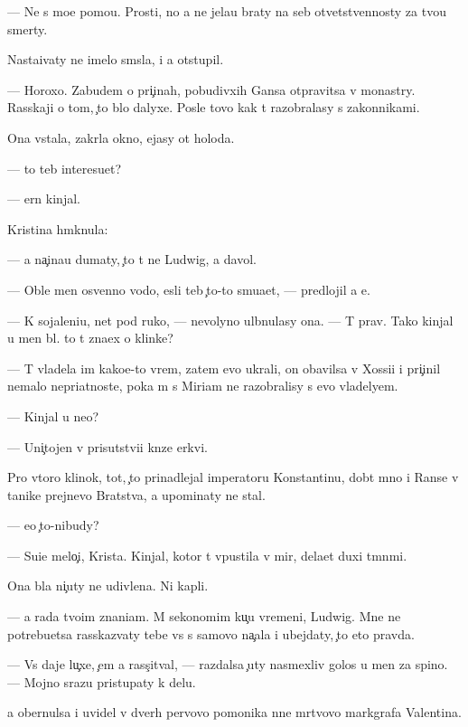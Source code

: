 \documentclass[10pt]{book}
\begin{document}
— Ne s mo{\y}e{\y} pomo{\x}{\y}u. Prosti, no {\y}a ne jela{\y}u braty na seb{\ia} otvetstvennosty za tvo{\y}u smerty.

Nasta{\y}ivaty ne imelo sm{\yi}sla, i {\y}a otstupil.

— Horoxo. Zabudem o pri{\c}inah, pobudivxih Gansa otpravitsa v monast{\yi}ry. Rasskaji o tom, {\c}to b{\yi}lo dalyxe. Posle tovo kak t{\yi} razobralasy s zakonnikami.

Ona vstala, zakr{\yi}la okno, {\y}ejasy ot holoda.

— {\C}to teb{\ia} interesu{\y}et?

— {\C}ern{\yi}{\y} kinjal.

Kristina hm{\yi}knula:

— {\Y}a na{\c}ina{\y}u dumaty, {\c}to t{\yi} ne Ludwig, a d{\y}avol.

— Oble{\y} men{\ia} osv{\ia}{\x}enno{\y} vodo{\y}, {\y}esli teb{\ia} {\c}to-to smu{\x}a{\y}et, — predlojil {\y}a {\y}e{\y}.

— K sojaleni{\y}u, net pod ruko{\y}, — nevolyno ul{\yi}bnulasy ona. — T{\yi} prav. Tako{\y} kinjal u men{\ia} b{\yi}l. {\C}to t{\yi} zna{\y}ex o klinke?

— T{\yi} vladela im kako{\y}e-to vrem{\ia}, zatem {\y}evo ukrali, on ob{\y}avilsa v Xossi{\y}i i pri{\c}inil nemalo nepri{\y}atnoste{\y}, poka m{\yi} s Miriam ne razobralisy s {\y}evo vladely{\q}em.

— Kinjal u ne{\y}o?

— Uni{\c}tojen v prisutstvi{\y}i kn{\ia}ze{\y} {\Q}erkvi.

Pro vtoro{\y} klinok, tot, {\c}to prinadlejal imperatoru Konstantinu, dob{\yi}t{\yi}{\y} mno{\y} i Ranse v ta{\y}nike prejnevo Bratstva, {\y}a upominaty ne stal.

— {\y}e{\x}o {\c}to-nibudy?

— Su{\x}i{\y}e melo{\c}i, Krista. Kinjal, kotor{\yi}{\y} t{\yi} v{\yi}pustila v mir, dela{\y}et duxi t{\e}mn{\yi}mi.

Ona b{\yi}la ni{\c}uty ne udivlena. Ni kapli.

— {\Y}a rada tvo{\y}im znani{\y}am. M{\yi} sekonomim ku{\c}u vremeni, Ludwig. Mne ne potrebu{\y}etsa rasskaz{\yi}vaty tebe vs{\e} s samovo na{\c}ala i ubejdaty, {\c}to eto pravda.

— Vs{\e} daje lu{\c}xe, {\c}em {\y}a rass{\c}it{\yi}val, — razdalsa {\c}uty nasmexliv{\yi}{\y} golos u men{\ia} za spino{\y}. — Mojno srazu pristupaty k delu.

{\Y}a obernulsa i uvidel v dver{\ia}h pervovo pomo{\x}nika n{\yi}ne m{\e}rtvovo markgrafa Valentina.
\end{document}
